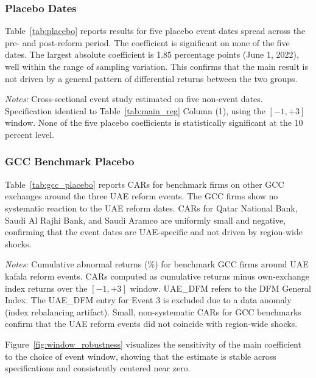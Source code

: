 \documentclass[12pt]{article}
\newcommand{\floatfoot}[1]{\par\vspace{3pt}\footnotesize\textit{Notes:} #1}
\begin{document}
\subsubsection{Placebo Dates}

Table~\ref{tab:placebo} reports results for five placebo event dates spread across the pre- and post-reform period. The coefficient is significant on none of the five dates. The largest absolute coefficient is 1.85 percentage points (June 1, 2022), well within the range of sampling variation. This confirms that the main result is not driven by a general pattern of differential returns between the two groups.

\begin{table}[H]
\centering
\caption{Placebo Date Tests}
\label{tab:placebo}

\floatfoot{Cross-sectional event study estimated on five non-event dates. Specification identical to Table~\ref{tab:main_reg} Column (1), using the $[-1, +3]$ window. None of the five placebo coefficients is statistically significant at the 10 percent level.}
\end{table}

\subsubsection{GCC Benchmark Placebo}

Table~\ref{tab:gcc_placebo} reports CARs for benchmark firms on other GCC exchanges around the three UAE reform events. The GCC firms show no systematic reaction to the UAE reform dates. CARs for Qatar National Bank, Saudi Al Rajhi Bank, and Saudi Aramco are uniformly small and negative, confirming that the event dates are UAE-specific and not driven by region-wide shocks.

\begin{table}[H]
\centering
\caption{GCC Benchmark Firm Placebo}
\label{tab:gcc_placebo}
\resizebox{\textwidth}{!}{}
\floatfoot{Cumulative abnormal returns (\%) for benchmark GCC firms around UAE kafala reform events. CARs computed as cumulative returns minus own-exchange index returns over the $[-1, +3]$ window. UAE\_DFM refers to the DFM General Index. The UAE\_DFM entry for Event 3 is excluded due to a data anomaly (index rebalancing artifact). Small, non-systematic CARs for GCC benchmarks confirm that the UAE reform events did not coincide with region-wide shocks.}
\end{table}

Figure~\ref{fig:window_robustness} visualizes the sensitivity of the main coefficient to the choice of event window, showing that the estimate is stable across specifications and consistently centered near zero.
\end{document}
